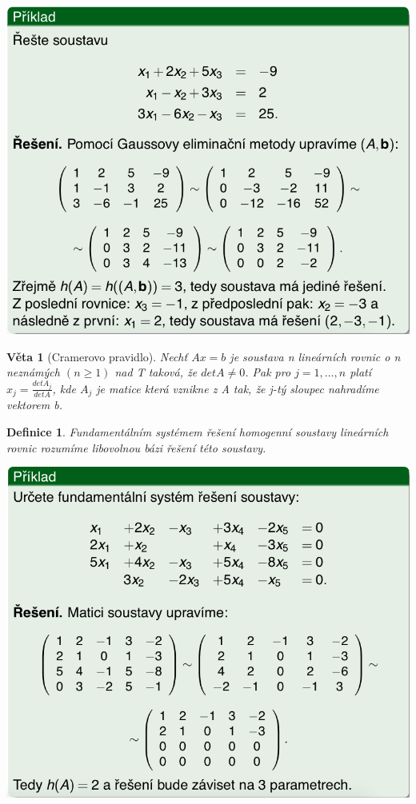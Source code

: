 \documentclass[12pt,a4paper]{article}
\newtheorem{definition}{Definice}
\newtheorem{sentence}{Věta}
\begin{document}
\includegraphics[scale=0.5]{img/LinSoust2}

\begin{sentence}[Cramerovo pravidlo]
	Nechť $Ax = b$ je soustava n lineárních rovnic o n neznámých $(n \geq 1)$ nad T taková, že $detA \not= 0$. Pak pro $j = 1, \dots,n$ platí $x_j = \frac{detA_j}{detA}$, kde $A_j$ je matice která vznikne z A tak, že j-tý sloupec nahradíme vektorem b.
\end{sentence}

\begin{definition}
	Fundamentálním systémem řešení homogenní soustavy lineárních rovnic rozumíme libovolnou bázi řešení této soustavy.
\end{definition}
\includegraphics[scale=0.5]{img/LinSoust3}
\end{document}
